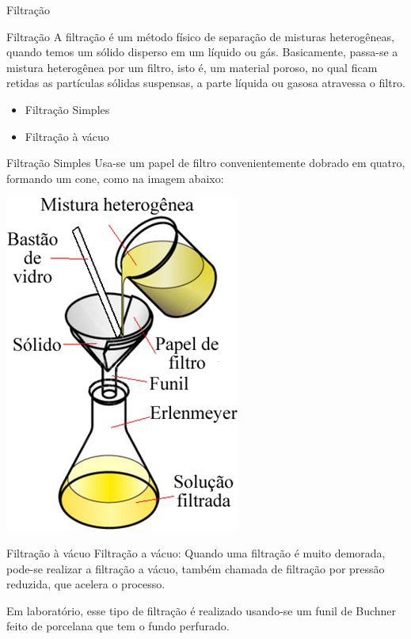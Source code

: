 \documentclass{beamer}
\begin{document}
\begin{frame}[label={sec:org6152427}]{Filtração}
\begin{block}{Filtração}
A filtração é um método físico de separação de misturas heterogêneas, quando temos um sólido disperso em um líquido ou gás. Basicamente, passa-se a mistura heterogênea por um filtro, isto é, um material poroso, no qual ficam retidas as partículas sólidas suspensas, a parte líquida ou gasosa atravessa o filtro.

\begin{itemize}
\item \alert{Filtração Simples}
\item \alert{Filtração à vácuo}
\end{itemize}
\end{block}
\begin{block}{Filtração Simples}
Usa-se um papel de filtro convenientemente dobrado em quatro, formando um cone, como na imagem abaixo:


\begin{center}
\includegraphics[scale=0.5]{../img/filtracao.jpg}
\end{center}
\end{block}
\begin{block}{Filtração à vácuo}
Filtração a vácuo: Quando uma filtração é muito demorada, pode-se realizar a filtração a vácuo, também chamada de filtração por pressão reduzida, que acelera o processo.

Em laboratório, esse tipo de filtração é realizado usando-se um funil de Buchner feito de porcelana que tem o fundo perfurado.


\end{block}
\end{frame}
\end{document}

